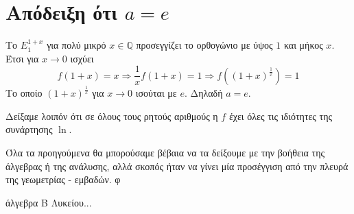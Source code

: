 \documentclass[12pt,titlepage]{article}
\begin{document}
\section{Απόδειξη ότι $a=e$}
Το $E_1^{1+x}$ για πολύ μικρό $x\in \mathbb{Q}$ προσεγγίζει το ορθογώνιο με ύψος $1$ και μήκος $x$. Έτσι για $x\to 0$ ισχύει
$$f(1+x)=x \Rightarrow \frac{1}{x}f(1+x)=1 \Rightarrow f\left( (1+x)^{\frac{1}{x}} \right)=1$$
Το οποίο $(1+x)^{\frac{1}{x}}$ για $x\to 0$ ισούται με $e$. Δηλαδή $a=e$.

Δείξαμε λοιπόν ότι σε όλους τους ρητούς αριθμούς η $f$ έχει όλες τις ιδιότητες της συνάρτησης $\ln $.

Όλα τα προηγούμενα θα μπορούσαμε βέβαια να τα δείξουμε με την βοήθεια της άλγεβρας ή της ανάλυσης, αλλά σκοπός ήταν να γίνει μία προσέγγιση από την πλευρά της γεωμετρίας - εμβαδών. φ

\begin{thebibliography}{9}
άλγεβρα Β Λυκείου...

\end{thebibliography}
\end{document}
